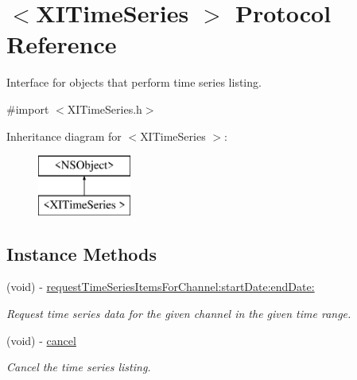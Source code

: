 \hypertarget{protocol_x_i_time_series_01-p}{}\section{$<$X\+I\+Time\+Series $>$ Protocol Reference}
\label{protocol_x_i_time_series_01-p}


Interface for objects that perform time series listing.  




{\ttfamily \#import $<$X\+I\+Time\+Series.\+h$>$}

Inheritance diagram for $<$X\+I\+Time\+Series $>$\+:\begin{figure}[H]
\begin{center}
\leavevmode
\includegraphics[height=2.000000cm]{protocol_x_i_time_series_01-p}
\end{center}
\end{figure}
\subsection*{Instance Methods}
\begin{DoxyCompactItemize}
\item 
(void) -\/ \hyperlink{protocol_x_i_time_series_01-p_aa52c1e154fd5b74caa7a5e7c3e6ddc64}{request\+Time\+Series\+Items\+For\+Channel\+:start\+Date\+:end\+Date\+:}
\begin{DoxyCompactList}\small\item\em Request time series data for the given channel in the given time range. \end{DoxyCompactList}\item 
(void) -\/ \hyperlink{protocol_x_i_time_series_01-p_a0835de2f42cac50f6e0da9af775047c2}{cancel}
\begin{DoxyCompactList}\small\item\em Cancel the time series listing. \end{DoxyCompactList}\end{DoxyCompactItemize}
